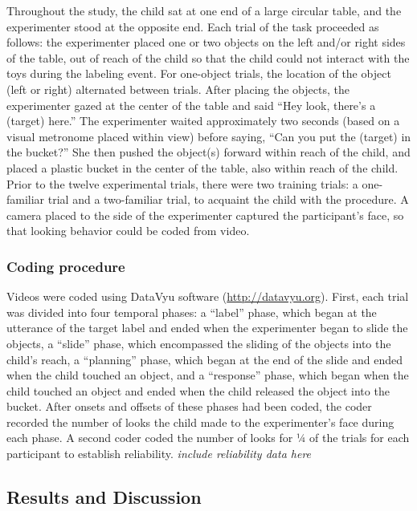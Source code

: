 \documentclass[10pt, letterpaper]{article}
\begin{document}
Throughout the study, the child sat at one end of a large circular
table, and the experimenter stood at the opposite end. Each trial of the
task proceeded as follows: the experimenter placed one or two objects on
the left and/or right sides of the table, out of reach of the child so
that the child could not interact with the toys during the labeling
event. For one-object trials, the location of the object (left or right)
alternated between trials. After placing the objects, the experimenter
gazed at the center of the table and said ``Hey look, there's a (target)
here.'' The experimenter waited approximately two seconds (based on a
visual metronome placed within view) before saying, ``Can you put the
(target) in the bucket?'' She then pushed the object(s) forward within
reach of the child, and placed a plastic bucket in the center of the
table, also within reach of the child. Prior to the twelve experimental
trials, there were two training trials: a one-familiar trial and a
two-familiar trial, to acquaint the child with the procedure. A camera
placed to the side of the experimenter captured the participant's face,
so that looking behavior could be coded from video.

\subsubsection{Coding procedure}\label{coding-procedure}

Videos were coded using DataVyu software (\url{http://datavyu.org}).
First, each trial was divided into four temporal phases: a ``label''
phase, which began at the utterance of the target label and ended when
the experimenter began to slide the objects, a ``slide'' phase, which
encompassed the sliding of the objects into the child's reach, a
``planning'' phase, which began at the end of the slide and ended when
the child touched an object, and a ``response'' phase, which began when
the child touched an object and ended when the child released the object
into the bucket. After onsets and offsets of these phases had been
coded, the coder recorded the number of looks the child made to the
experimenter's face during each phase. A second coder coded the number
of looks for ¼ of the trials for each participant to establish
reliability. \emph{include reliability data here}

\subsection{Results and Discussion}\label{results-and-discussion}
\end{document}
